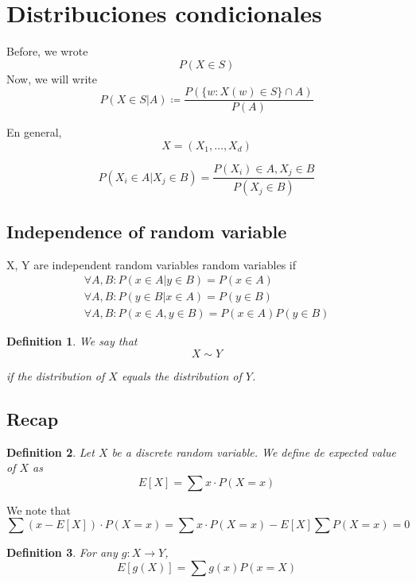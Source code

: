 \documentclass{article}
\newtheorem{definition}{Definition}
\begin{document}
	
\section{Distribuciones condicionales}\label{sec:distribuciones_condicionales} %
 Before, we wrote
 \[
  P(X\in S)
 \]
 Now, we will write 
 \[
   P(X\in S|A) \coloneqq \frac{P(\{w:X(w)\in S\}\cap A)}{P(A)}
 \]

En general, 
\[
  X=(X_1, \dots, X_d)
\]

\[
  P(X_i\in A | X_j \in B) = \displaystyle\frac{P(X_i)\in A, X_j \in B}{P(X_j \in B)}
\]

\subsection{Independence of random variable}

X, Y are independent random variables random variables if 
\begin{align*}
  \forall A,B: P(x\in A|y\in B) = P(x\in A)\\
  \forall A,B: P(y\in B|x\in A) = P(y\in B)\\
  \forall A,B: P(x\in A,y\in B) = P(x\in A)P(y\in B)
\end{align*}


\begin{definition}
  We say that 
  \begin{displaymath}
    X \sim Y
  \end{displaymath}
  
  if the distribution of $ X $ equals the distribution of $ Y $.
\end{definition}

\subsection{Recap}

\begin{definition}
  Let $ X $ be a discrete random variable. We define de \textit{expected value} of $ X $ as
  \begin{displaymath}
    E[X] = \sum x \cdot P(X=x)
  \end{displaymath}
  
\end{definition}
We note that
\[
  \sum (x-E[X])\cdot P(X=x) = \sum x\cdot P(X = x) - E[X]\sum P(X=x) = 0
\]

\begin{definition}
  For any $ g:X \to Y$,
  \begin{displaymath}
    E[g(X)] = \sum g(x)P(x=X)
  \end{displaymath}
  
\end{definition}
\end{document}

